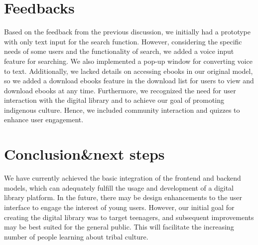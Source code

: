 \section{Feedbacks}
Based on the feedback from the previous discussion, we initially had a prototype with only text input for the search function. However, considering the specific needs of some users and the functionality of search, we added a voice input feature for searching. We also implemented a pop-up window for converting voice to text. Additionally, we lacked details on accessing ebooks in our original model, so we added a download ebooks feature in the download list for users to view and download ebooks at any time. Furthermore, we recognized the need for user interaction with the digital library and to achieve our goal of promoting indigenous culture. Hence, we included community interaction and quizzes to enhance user engagement.


\section{Conclusion\&next steps} 

We have currently achieved the basic integration of the frontend and backend models, which can adequately fulfill the usage and development of a digital library platform. In the future, there may be design enhancements to the user interface to engage the interest of young users. However, our initial goal for creating the digital library was to target teenagers, and subsequent improvements may be best suited for the general public. This will facilitate the increasing number of people learning about tribal culture.


